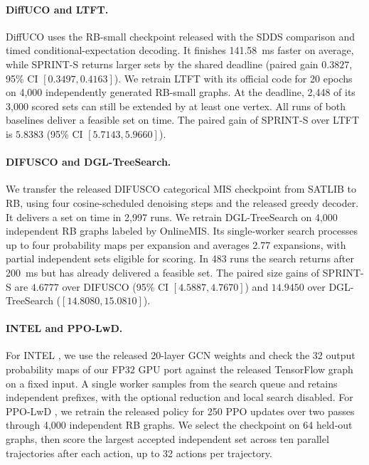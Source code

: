 \paragraph{DiffUCO and LTFT.}
DiffUCO \citep{sanokowski2024diffusion} uses the RB-small checkpoint released with the SDDS comparison \citep{sanokowski2025sdds} and timed conditional-expectation decoding. It finishes 141.58~ms faster on average, while SPRINT-S returns larger sets by the shared deadline (paired gain \(0.3827\), 95\% CI \([0.3497,0.4163]\)). We retrain LTFT \citep{zhang2023flows} with its official code for 20 epochs on 4,000 independently generated RB-small graphs. At the deadline, 2,448 of its 3,000 scored sets can still be extended by at least one vertex. All runs of both baselines deliver a feasible set on time. The paired gain of SPRINT-S over LTFT is \(5.8383\) (95\% CI \([5.7143,5.9660]\)).

\paragraph{DIFUSCO and DGL-TreeSearch.}
We transfer the released DIFUSCO categorical MIS checkpoint \citep{sun2023difusco} from SATLIB to RB, using four cosine-scheduled denoising steps and the released greedy decoder. It delivers a set on time in 2,997 runs. We retrain DGL-TreeSearch \citep{boether2022tree} on 4,000 independent RB graphs labeled by OnlineMIS. Its single-worker search processes up to four probability maps per expansion and averages 2.77 expansions, with partial independent sets eligible for scoring. In 483 runs the search returns after 200~ms but has already delivered a feasible set. The paired size gains of SPRINT-S are \(4.6777\) over DIFUSCO (95\% CI \([4.5887,4.7670]\)) and \(14.9450\) over DGL-TreeSearch (\([14.8080,15.0810]\)).

\paragraph{INTEL and PPO-LwD.}
For INTEL \citep{li2018guided}, we use the released 20-layer GCN weights and check the 32 output probability maps of our FP32 GPU port against the released TensorFlow graph on a fixed input. A single worker samples from the search queue and retains independent prefixes, with the optional reduction and local search disabled. For PPO-LwD \citep{ahn2020defer}, we retrain the released policy for 250 PPO updates over two passes through 4,000 independent RB graphs. We select the checkpoint on 64 held-out graphs, then score the largest accepted independent set across ten parallel trajectories after each action, up to 32 actions per trajectory.

